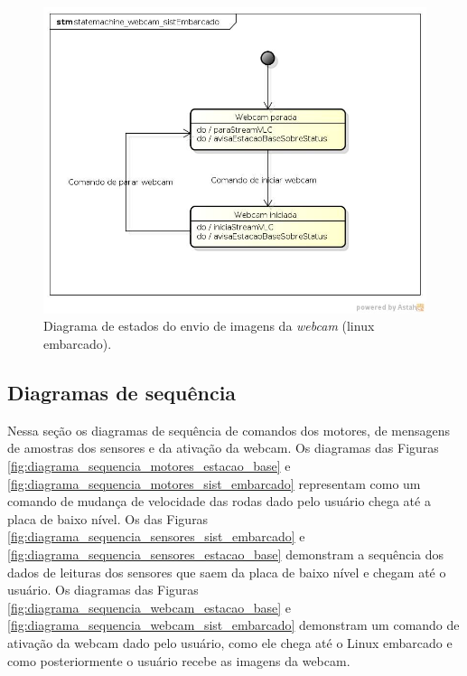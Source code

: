 \begin{figure}[H]
  \centering
  \includegraphics[width=\textwidth, keepaspectratio]{./figuras/sistEmbarcado/statemachine_webcam_sistEmbarcado.jpg}
  \caption{Diagrama de estados do envio de imagens da \textit{webcam} (linux embarcado).}
  \label{fig:diagrama_estados_webcam_sist_embarcado}
\end{figure}



\subsection{Diagramas de sequência}

Nessa seção os diagramas de sequência de comandos dos motores, de mensagens de amostras dos sensores e da ativação da webcam. Os diagramas das Figuras \ref{fig:diagrama_sequencia_motores_estacao_base} e \ref{fig:diagrama_sequencia_motores_sist_embarcado} representam como um comando de mudança de velocidade das rodas dado pelo usuário chega até a placa de baixo nível. Os das Figuras \ref{fig:diagrama_sequencia_sensores_sist_embarcado} e \ref{fig:diagrama_sequencia_sensores_estacao_base} demonstram a sequência dos dados de leituras dos sensores que saem da placa de baixo nível e chegam até o usuário.  Os diagramas das Figuras \ref{fig:diagrama_sequencia_webcam_estacao_base} e \ref{fig:diagrama_sequencia_webcam_sist_embarcado} demonstram um comando de ativação da webcam dado pelo usuário, como ele chega até o Linux embarcado e como posteriormente o usuário recebe as imagens da webcam.

